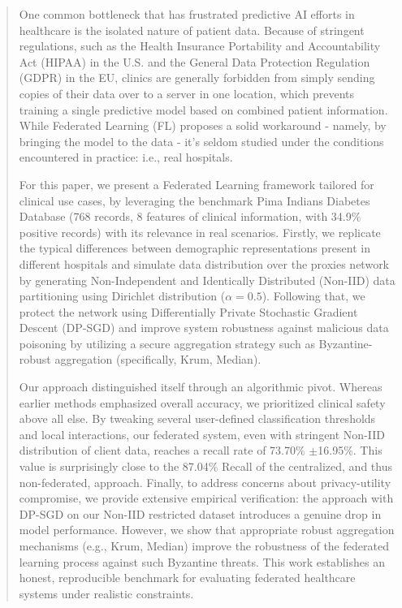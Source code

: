 \documentclass[conference]{IEEEtran}
\begin{document}
\begin{abstract}
One common bottleneck that has frustrated predictive AI efforts in healthcare is the isolated nature of patient data. Because of stringent regulations, such as the Health Insurance Portability and Accountability Act (HIPAA) in the U.S. and the General Data Protection Regulation (GDPR) in the EU, clinics are generally forbidden from simply sending copies of their data over to a server in one location, which prevents training a single predictive model based on combined patient information. While Federated Learning (FL) proposes a solid workaround - namely, by bringing the model to the data - it's seldom studied under the conditions encountered in practice: i.e., real hospitals.

For this paper, we present a Federated Learning framework tailored for clinical use cases, by leveraging the benchmark Pima Indians Diabetes Database (768 records, 8 features of clinical information, with 34.9\% positive records) with its relevance in real scenarios. Firstly, we replicate the typical differences between demographic representations present in different hospitals and simulate data distribution over the proxies network by generating Non-Independent and Identically Distributed (Non-IID) data partitioning using Dirichlet distribution ($ \alpha = 0.5 $). Following that, we protect the network using Differentially Private Stochastic Gradient Descent (DP-SGD) and improve system robustness against malicious data poisoning by utilizing a secure aggregation strategy such as Byzantine-robust aggregation (specifically, Krum, Median).

Our approach distinguished itself through an algorithmic pivot. Whereas earlier methods emphasized overall accuracy, we prioritized clinical safety above all else. By tweaking several user-defined classification thresholds and local interactions, our federated system, even with stringent Non-IID distribution of client data, reaches a recall rate of 73.70\% \( \pm \)16.95\%. This value is surprisingly close to the 87.04\% Recall of the centralized, and thus non-federated, approach. Finally, to address concerns about privacy-utility compromise, we provide extensive empirical verification: the approach with DP-SGD on our Non-IID restricted dataset introduces a genuine drop in model performance. However, we show that appropriate robust aggregation mechanisms (e.g., Krum, Median) improve the robustness of the federated learning process against such Byzantine threats. This work establishes an honest, reproducible benchmark for evaluating federated healthcare systems under realistic constraints.
\end{abstract}
\end{document}
